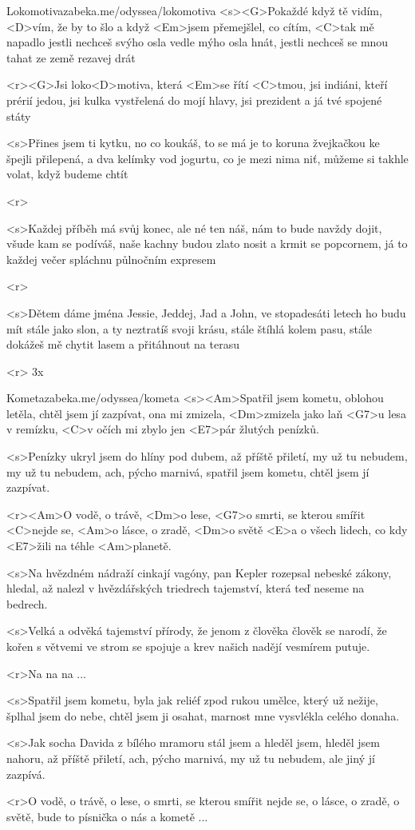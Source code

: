 \begin{song}[Poletíme?]{5}{Lokomotiva}{zabeka.me/odyssea/lokomotiva}
<s><G>Pokaždé když tě vidím, <D>vím, že by to šlo 
a když <Em>jsem přemejšlel, co cítím, <C>tak mě napadlo 
jestli nechceš svýho osla vedle mýho osla hnát, 
jestli nechceš se mnou tahat ze země rezavej drát 

<r><G>Jsi loko<D>motiva, která <Em>se řítí <C>tmou, 
jsi indiáni, kteří prérií jedou, 
jsi kulka vystřelená do mojí hlavy,
jsi prezident a já tvé spojené státy 

<s>Přines jsem ti kytku, no co koukáš, to se má 
je to koruna žvejkačkou ke špejli přilepená, 
a dva kelímky vod jogurtu, co je mezi nima niť, 
můžeme si takhle volat, když budeme chtít 

<r>

<s>Každej příběh má svůj konec, ale né ten náš, 
nám to bude navždy dojit, všude kam se podíváš, 
naše kachny budou zlato nosit a krmit se popcornem, 
já to každej večer spláchnu půlnočním expresem 

<r>

<s>Dětem dáme jména Jessie, Jeddej, Jad a John, 
ve stopadesáti letech ho budu mít stále jako slon, 
a ty neztratíš svoji krásu, stále štíhlá kolem pasu, 
stále dokážeš mě chytit lasem a přitáhnout na terasu 

<r>
3x 

\end{song}
\begin{song}{6}{Kometa}{zabeka.me/odyssea/kometa}
<s><Am>Spatřil jsem kometu, oblohou letěla,
chtěl jsem jí zazpívat, ona mi zmizela,
<Dm>zmizela jako laň <G7>u lesa v remízku,
<C>v očích mi zbylo jen <E7>pár žlutých penízků.

<s>Penízky ukryl jsem do hlíny pod dubem,
až příště přiletí, my už tu nebudem,
my už tu nebudem, ach, pýcho marnivá,
spatřil jsem kometu, chtěl jsem jí zazpívat.

<r><Am>O vodě, o trávě, <Dm>o lese,
<G7>o smrti, se kterou smířit <C>nejde se,
<Am>o lásce, o zradě, <Dm>o světě 
<E>a o všech lidech, co kdy <E7>žili na téhle <Am>planetě.

<s>Na hvězdném nádraží cinkají vagóny,
pan Kepler rozepsal nebeské zákony,
hledal, až nalezl v hvězdářských triedrech
tajemství, která teď neseme na bedrech.

<s>Velká a odvěká tajemství přírody,
že jenom z člověka člověk se narodí,
že kořen s větvemi ve strom se spojuje
a krev našich nadějí vesmírem putuje.

<r>Na na na ...

<s>Spatřil jsem kometu, byla jak reliéf
zpod rukou umělce, který už nežije,
šplhal jsem do nebe, chtěl jsem ji osahat,
marnost mne vysvlékla celého donaha.

<s>Jak socha Davida z bílého mramoru
stál jsem a hleděl jsem, hleděl jsem nahoru,
až příště přiletí, ach, pýcho marnivá,
my už tu nebudem, ale jiný jí zazpívá.

<r>O vodě, o trávě, o lese,
o smrti, se kterou smířit nejde se,
o lásce, o zradě, o světě,
bude to písnička o nás a kometě ...
\end{song}
